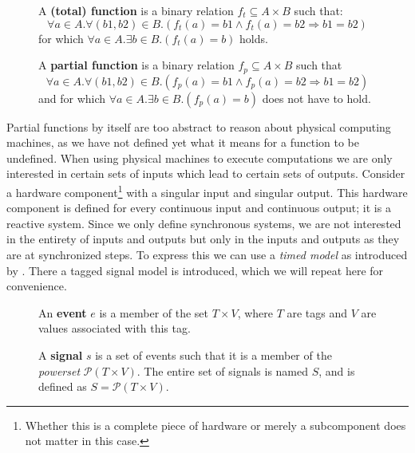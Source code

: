\begin{figure}[H]
A \textbf{(total) function} is a binary relation $f_t \subseteq A \times B$ such that:
\[ \forall a \in A. \forall (b1,b2) \in B.( f_t(a) = b1 \land f_t(a) = b2 \Rightarrow b1 = b2) \]
for which $ \forall a \in A. \exists b \in B. ( f_t(a) = b ) $ holds.
\end{figure}

\begin{figure}[H]
A \textbf{partial function} is a binary relation $f_p \subseteq A \times B$ such that
\[ \forall a \in A. \forall (b1,b2) \in B.( f_p(a) = b1 \land f_p(a) = b2 \Rightarrow b1 = b2) \]
and for which $ \forall a \in A. \exists b \in B. ( f_p(a) = b ) $ does not have to hold.
\end{figure}

Partial functions by itself are too abstract to reason about physical computing machines, as we have not defined yet what it means for a function to be undefined.
When using physical machines to execute computations we are only interested in certain sets of inputs which lead to certain sets of outputs.
Consider a hardware component\footnote{Whether this is a complete piece of hardware or merely a subcomponent does not matter in this case.} with a singular input and singular output.
This hardware component is defined for every continuous input and continuous output; it is a reactive system.
Since we only define synchronous systems, we are not interested in the entirety of inputs and outputs but only in the inputs and outputs as they are at synchronized steps.
To express this we can use a \textit{timed model} as introduced by \citeauthor{lee1998framework}\cite{lee1998framework}.
There a tagged signal model is introduced, which we will repeat here for convenience.

\begin{figure}[H]
An \textbf{event} $e$ is a member of the set $T \times V$, where $T$ are tags and $V$ are values associated with this tag.
\end{figure}

\begin{figure}[H]
A \textbf{signal} $s$ is a set of events such that it is a member of the \textit{powerset} $\mathcal{P}(T \times V)$.
The entire set of signals is named $S$, and is defined as $S = \mathcal{P}(T \times V)$.
\end{figure}

